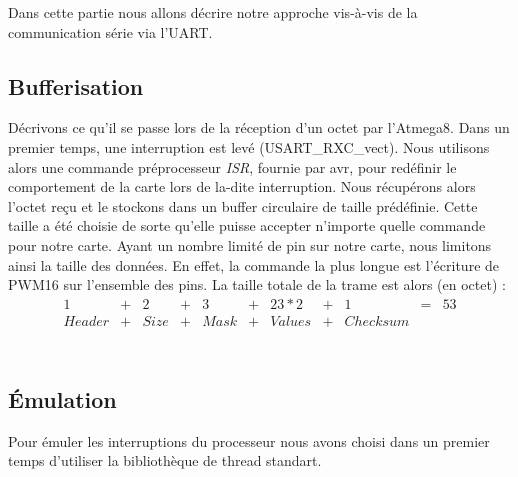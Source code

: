 Dans cette partie nous allons décrire notre approche vis-à-vis de la 
communication série via l'UART.


\subsection{Bufferisation}
Décrivons ce qu'il se passe lors de la réception d'un octet par l'Atmega8. 
Dans un premier temps, une interruption est levé (USART\_RXC\_vect). Nous 
utilisons alors une commande préprocesseur \textit{ISR}, fournie par avr, 
pour redéfinir le comportement de la carte lors de la-dite interruption.
Nous récupérons alors l'octet reçu et le stockons dans un buffer circulaire
de taille prédéfinie. Cette taille a été choisie de sorte qu'elle puisse 
accepter n'importe quelle commande pour notre carte. Ayant un nombre limité
de pin sur notre carte, nous limitons ainsi la taille des données. En 
effet, la commande la plus longue est l'écriture de PWM16 sur l'ensemble
des pins. La taille totale de la trame est alors (en octet) : \\
$$
\begin{array}{ccccccccccc}
1     &+&   2&+&   3&+&  23*2&+&       1&=&53\\
Header&+&Size&+&Mask&+&Values&+&Checksum& &\\
\end{array}
$$
~\\



\subsection{Émulation}
Pour émuler les interruptions du processeur nous avons choisi dans un
premier temps d'utiliser la bibliothèque de thread standart.

\subsection{}
